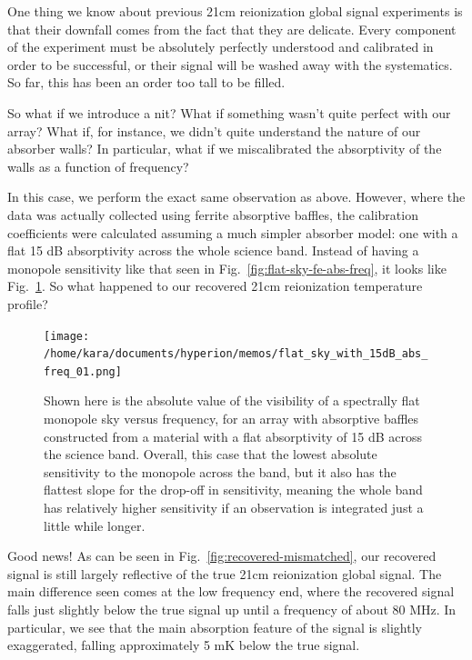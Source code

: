 One thing we know about previous 21cm reionization global signal experiments is 
that their downfall comes from the fact that they are delicate. Every component 
of the experiment must be absolutely perfectly understood and calibrated in 
order to be successful, or their signal will be washed away with the 
systematics. So far, this has been an order too tall to be filled.

So what if we introduce a nit? What if something wasn't quite perfect with our 
array? What if, for instance, we didn't quite understand the nature of our 
absorber walls? In particular, what if we miscalibrated the absorptivity of the 
walls as a function of frequency?

In this case, we perform the exact same observation as above. However, where 
the data was actually collected using ferrite absorptive baffles, the 
calibration coefficients were calculated assuming a much simpler absorber 
model: one with a flat 15 dB absorptivity across the whole science band.  
Instead of having a monopole sensitivity like that seen in 
Fig.~\ref{fig:flat-sky-fe-abs-freq}, it looks like 
Fig.~\ref{fig:flat-sky-15dB-abs-freq}. So what happened to our recovered 21cm 
reionization temperature profile?

\begin{figure}
    \begin{center}
    \texttt{[image: /home/kara/documents/hyperion/memos/flat\_sky\_with\_15dB\_abs\_freq\_01.png]}
    \end{center}
    \caption{
        Shown here is the absolute value of the visibility of a spectrally flat 
        monopole sky versus frequency, for an array with absorptive baffles 
        constructed from a material with a flat absorptivity of 15 dB across 
        the science band. Overall, this case that the lowest absolute 
        sensitivity to the monopole across the band, but it also has the 
        flattest slope for the drop-off in sensitivity, meaning the whole band 
        has relatively higher sensitivity if an observation is integrated just 
        a little while longer.
    }
    \label{fig:flat-sky-15dB-abs-freq}
\end{figure}

Good news! As can be seen in Fig.~\ref{fig:recovered-mismatched}, our recovered 
signal is still largely reflective of the true 21cm reionization global signal.  
The main difference seen comes at the low frequency end, where the recovered 
signal falls just slightly below the true signal up until a frequency of about 
80 MHz. In particular, we see that the main absorption feature of the signal is 
   slightly exaggerated, falling approximately 5 mK below the true signal.

